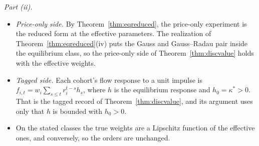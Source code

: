 \documentclass[12pt]{article}
\theoremstyle{definition}
\theoremstyle{remark}
\begin{document}
\emph{Part (ii).}
\begin{itemize}[itemsep=1pt,topsep=2pt]
\item \emph{Price-only side.} By Theorem~\ref{thm:eqreduced}, the price-only experiment is the reduced form at the effective parameters. The realization of Theorem~\ref{thm:eqreduced}(iv) puts the Gauss and Gauss--Radau pair inside the equilibrium class, so the price-only side of Theorem~\ref{thm:discvalue} holds with the effective weights.
\item \emph{Tagged side.} Each cohort's flow response to a unit impulse is $f_{i,t}=w_i\sum_{s\le t}r_i^{t-s}h_s$, where $h$ is the equilibrium response and $h_0=\kappa^*>0$. That is the tagged record of Theorem~\ref{thm:discvalue}, and its argument uses only that $h$ is bounded with $h_0>0$.
\item On the stated classes the true weights are a Lipschitz function of the effective ones, and conversely, so the orders are unchanged.
\end{itemize}
\end{document}
